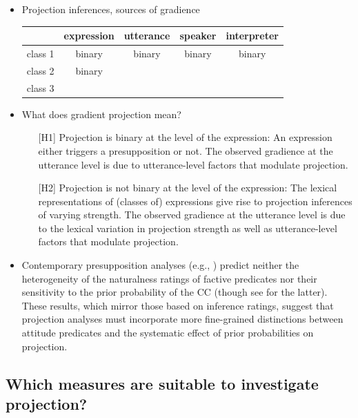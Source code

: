 \documentclass[11pt,fleqn]{article}
\newcommand{\6}{\mbox{$[\hspace*{-.6mm}[$}}
\newcommand{\9}{\mbox{$]\hspace*{-.6mm}]$}}
\begin{document}
\begin{itemize}
\item Projection inferences, sources of gradience

\begin{tabular}{l c c c c} \\ 
             & expression & utterance & speaker & interpreter \\\hline
class 1 &  binary & binary & binary & binary \\
class 2 &  binary & & & \\ 
class 3 & & & & \\

\end{tabular}


\item What does gradient projection mean?

\begin{itemize}

\item[{[H1]}] Projection is binary at the level of the expression: An expression either triggers a presupposition or not. The observed gradience at the utterance level is due to utterance-level factors that modulate projection.

\item[{[H2]}] Projection is not binary at the level of the expression: The lexical representations of (classes of) expressions give rise to projection inferences of varying strength. The observed gradience at the utterance level is due to the lexical variation in projection strength as well as utterance-level factors that modulate projection.

\end{itemize}

\item Contemporary presupposition analyses (e.g., \citealt{heim83,vds92,abrusan2011,karttunen2016,simons-etal2017}) predict neither the heterogeneity of the naturalness ratings of factive predicates nor their sensitivity to the prior probability of the CC (though see \citealt{schlenker2021} for the latter). These results, which mirror those based on inference ratings, suggest that projection analyses must incorporate more fine-grained distinctions between attitude predicates and the systematic effect of prior probabilities on projection.

\end{itemize}

\subsection{Which measures are suitable to investigate projection?}
\end{document}
